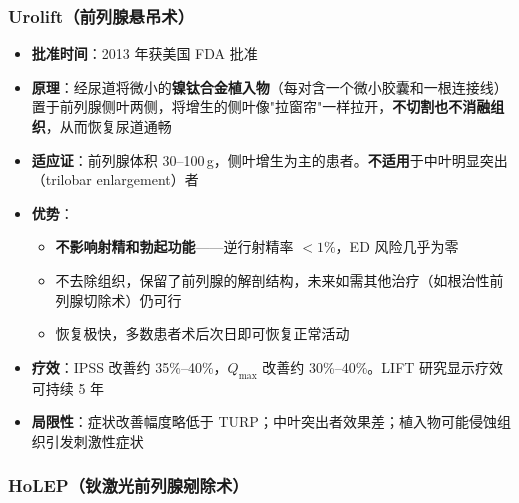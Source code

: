 \begin{enumerate}
\subsubsection{Urolift（前列腺悬吊术）}

\begin{itemize}[leftmargin=2cm]
	\item \textbf{批准时间}：2013 年获美国 FDA 批准
	\item \textbf{原理}：经尿道将微小的\textbf{镍钛合金植入物}（每对含一个微小胶囊和一根连接线）置于前列腺侧叶两侧，将增生的侧叶像"拉窗帘"一样拉开，\textbf{不切割也不消融组织}，从而恢复尿道通畅
	\item \textbf{适应证}：前列腺体积 30--100\,g，侧叶增生为主的患者。\textbf{不适用}于中叶明显突出（trilobar enlargement）者
	\item \textbf{优势}：
	\begin{itemize}
		\item \textbf{不影响射精和勃起功能}——逆行射精率 $<1\%$，ED 风险几乎为零
		\item 不去除组织，保留了前列腺的解剖结构，未来如需其他治疗（如根治性前列腺切除术）仍可行
		\item 恢复极快，多数患者术后次日即可恢复正常活动
	\end{itemize}
	\item \textbf{疗效}：IPSS 改善约 35\%--40\%，$Q_{\max}$ 改善约 30\%--40\%。LIFT 研究显示疗效可持续 5 年
	\item \textbf{局限性}：症状改善幅度略低于 TURP；中叶突出者效果差；植入物可能侵蚀组织引发刺激性症状
\end{itemize}

\subsubsection{HoLEP（钬激光前列腺剜除术）}


\end{enumerate}
